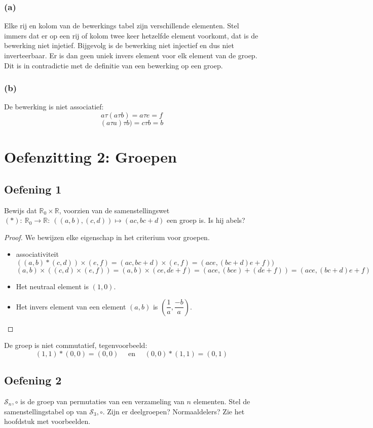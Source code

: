 \documentclass[main.tex]{subfiles}
\begin{document}
\subsubsection*{(a)}
Elke rij en kolom van de bewerkings tabel zijn verschillende elementen.
Stel immers dat er op een rij of kolom twee keer hetzelfde element voorkomt, dat is de bewerking niet injetief.
Bijgevolg is de bewerking niet injectief en dus niet inverteerbaar.
Er is dan geen uniek invers element voor elk element van de groep.
Dit is in contradictie met de definitie van een bewerking op een groep.

\subsubsection*{(b)}
De bewerking is niet associatief:
\[
a \tau (a \tau b)=a \tau e=f
\]
\[
(a \tau a) \tau b)=c \tau b=b
\]

\section{Oefenzitting 2: Groepen}
\subsection*{Oefening 1}

Bewijs dat $\mathbb{R}_0 \times \mathbb{R}$, voorzien van de samenstellingswet $(*):\ \mathbb{R}_{0}\rightarrow \mathbb{R}:\ ((a,b),(c,d)) \mapsto (ac,bc+d)$ een groep is.
Is hij abels?
\begin{proof} 
We bewijzen elke eigenschap in het criterium voor groepen.
\begin{itemize}
  \item associativiteit
  \[
  ((a,b)*(c,d))\times (e,f)=(ac,bc+d)\times (e,f)=(ace,(bc+d)e+f))
  \]
  \[
  (a,b) \times ((c,d) \times (e,f))=(a,b) \times
  (ce,de+f)=(ace,(bce)+(de+f))=(ace,(bc+d)e+f)
  \]
  \item Het neutraal element is $(1,0)$. 
  \item Het invers element van een element $(a,b)$ is  $(\dfrac{1}{a},\dfrac{-b}{a})$.
\end{itemize}
\end{proof}
De groep is niet commutatief, tegenvoorbeeld:
\[
(1,1)*(0,0) = (0,0) \quad\text{ en }\quad (0,0)*(1,1) = (0,1)
\]

\subsection*{Oefening 2}
$\mathcal{S}_{n},\circ$ is de groep van permutaties van een verzameling van $n$ elementen.
Stel de samenstellingstabel op van $\mathcal{S}_{3},\circ$.
Zijn er deelgroepen?
Normaaldelers? 
Zie het hoofdstuk met voorbeelden.
\end{document}

